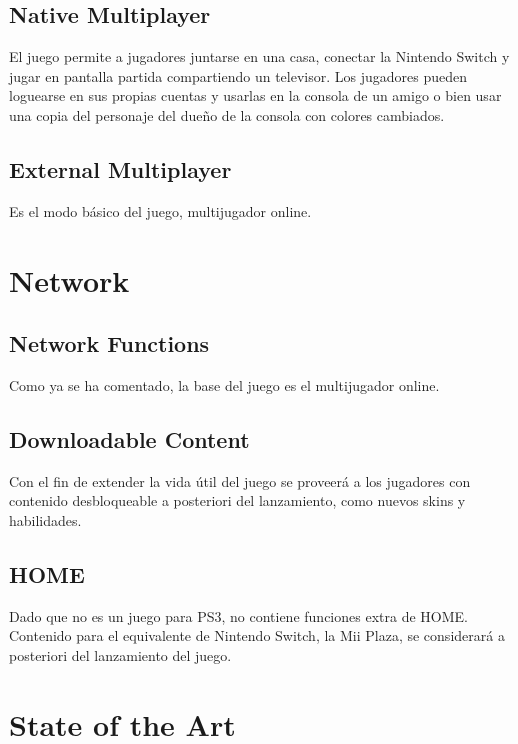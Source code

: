 \documentclass[12pt]{article}
\begin{document}
\subsection{Native Multiplayer}

El juego permite a jugadores juntarse en una casa, conectar la Nintendo Switch y jugar en pantalla partida compartiendo un televisor. Los jugadores pueden loguearse en sus propias cuentas y usarlas en la consola de un amigo o bien usar una copia del personaje del dueño de la consola con colores cambiados.

\subsection{External Multiplayer}

Es el modo básico del juego, multijugador online.

\newpage

\section{Network}

\subsection{Network Functions}

Como ya se ha comentado, la base del juego es el multijugador online.

\subsection{Downloadable Content}               

Con el fin de extender la vida útil del juego se proveerá a los jugadores con contenido desbloqueable a posteriori del lanzamiento, como nuevos skins y habilidades.

\subsection{HOME}

Dado que no es un juego para PS3, no contiene funciones extra de HOME. Contenido para el equivalente de Nintendo Switch, la Mii Plaza, se considerará a posteriori del lanzamiento del juego.

\newpage
\section{State of the Art}
\end{document}
